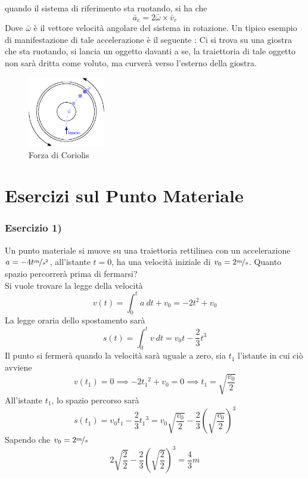 \documentclass[10pt, letterpaper]{report}
\begin{document}
quando il sistema di riferimento sta ruotando, si ha che 
$$\bar a_c = 2\bar \omega \times \bar v_r $$
Dove $\bar \omega$ è il vettore velocità angolare del sistema in rotazione. Un tipico esempio di 
manifestazione di tale accelerazione è il seguente : Ci si trova su una giostra che sta ruotando, 
si lancia un oggetto davanti a se, la traiettoria di tale oggetto non sarà dritta come 
voluto, ma curverà verso l'esterno della giostra.\begin{center}\begin{figure}[h!]
    \centering
    \includegraphics[width=0.3\textwidth]{images/Coriolis.eps}
    \caption{Forza di Coriolis}
    \label{fig:Coriolis}
\end{figure} \end{center}
\flowerLine
\section{Esercizi sul Punto Materiale}
\subsubsection{Esercizio 1)}
Un punto materiale si muove su una traiettoria rettilinea con un accelerazione 
$a=-4t\nicefrac{m}{s^2}$, all'istante $t=0$, ha una velocità iniziale di $v_0=2\nicefrac{m}{s}$. 
Quanto spazio percorrerà prima di fermarsi?\\ 
Si vuole trovare la legge della velocità 
$$v(t)=\int_0^t a  \ dt + v_0=-2t^2+v_0$$
La legge oraria dello spostamento sarà 
$$ s(t)=\int_0^t v \ dt = v_0t-\frac{2}{3}t^3$$
Il punto si fermerà quando la velocità sarà uguale a zero, sia $t_1$ l'istante in cui ciò avviene 
$$ v(t_1)=0\implies -2{t_1}^2+v_0=0\implies t_1=\sqrt{\frac{v_0}{2}}$$
All'istante $t_1$, lo spazio percorso sarà 
$$ s(t_1)=v_0t_1-\frac{2}{3}{t_1}^3=
v_0\sqrt{\frac{v_0}{2}}-\frac{2}{3}{(\sqrt{\frac{v_0}{2}})}^3$$Sapendo che $v_0=2\nicefrac{m}{s}$
$$
2\sqrt{\frac{2}{2}}-\frac{2}{3}{(\sqrt{\frac{2}{2}})}^3=\frac{4}{3} m
$$
\end{document}
